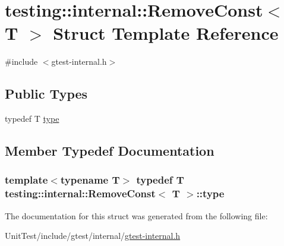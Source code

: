 \hypertarget{structtesting_1_1internal_1_1_remove_const}{\section{testing\+:\+:internal\+:\+:Remove\+Const$<$ T $>$ Struct Template Reference}
\label{structtesting_1_1internal_1_1_remove_const}
}


{\ttfamily \#include $<$gtest-\/internal.\+h$>$}

\subsection*{Public Types}
\begin{DoxyCompactItemize}
\item 
typedef T \hyperlink{structtesting_1_1internal_1_1_remove_const_a1be32027ea4edcc0d15abd59aba4a97f}{type}
\end{DoxyCompactItemize}


\subsection{Member Typedef Documentation}
\hypertarget{structtesting_1_1internal_1_1_remove_const_a1be32027ea4edcc0d15abd59aba4a97f}{
\subsubsection[{type}]{\setlength{\rightskip}{0pt plus 5cm}template$<$typename T$>$ typedef T {\bf testing\+::internal\+::\+Remove\+Const}$<$ T $>$\+::{\bf type}}}\label{structtesting_1_1internal_1_1_remove_const_a1be32027ea4edcc0d15abd59aba4a97f}


The documentation for this struct was generated from the following file\+:\begin{DoxyCompactItemize}
\item 
Unit\+Test/include/gtest/internal/\hyperlink{gtest-internal_8h}{gtest-\/internal.\+h}\end{DoxyCompactItemize}
